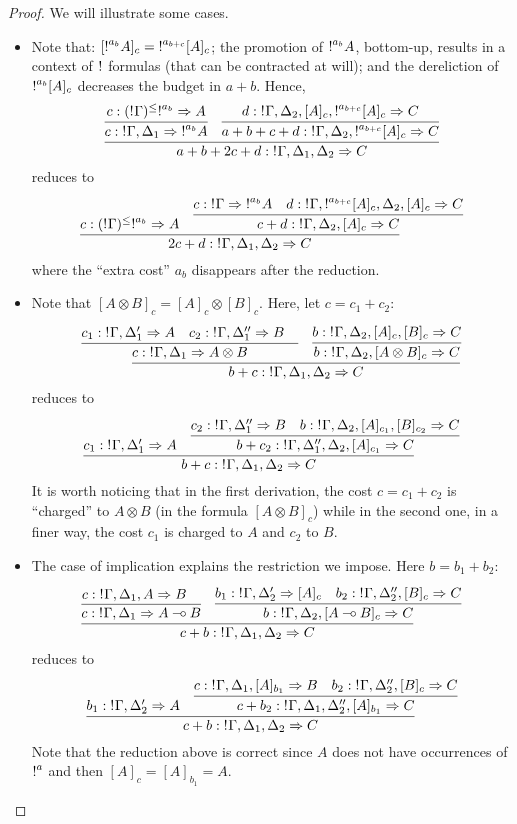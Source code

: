 \begin{proof}
We will illustrate some cases. 
\begin{itemize}
 \item Note that: $[\hbox{$\mathop{!}^{a_b}$}A]_c = \hbox{$\mathop{!}^{a_{b+c}}$}[A]_c$;  the promotion of $\hbox{$\mathop{!}^{a_b}$}A$, bottom-up, results in a context of 
 $\hbox{$\mathop{!}^{}$}$ formulas (that can be contracted at will);
 and   the dereliction of $\hbox{$\mathop{!}^{a_b}$}[A]_c$ decreases the budget in $a + b$. Hence, 
  $$
 \infer{a + b + 2c+d: \nbang{}\Gamma,\Delta_1,\Delta_2 \seq C}{
   \infer{c: \nbang{}\Gamma,\Delta_1 \seq \nbang{a_b}A}{c: (\nbang{}\Gamma)^\leqn{a_b}\seq A}&
   \infer{a+b+c+d: \nbang{}\Gamma, \Delta_2, \nbang{a_{b+c}}[A]_c \seq C}{d: \nbang{}\Gamma, \Delta_2, [A]_{c}, \nbang{a_{b+c}}[A]_c \seq C}
 }
 $$
reduces to
$$
   \infer{2c+d: \nbang{}\Gamma,\Delta_1,\Delta_2 \seq C}{
    \deduce{c: (\nbang{}\Gamma)^\leqn{a_b} \seq A}{} &
     \infer{c+d: \nbang{}\Gamma,\Delta_2, [A]_{c}\seq C}{
      \deduce{c:\nbang{}\Gamma \seq \nbang{a_b}A}{}&
      \deduce{d:\nbang{}\Gamma,\nbang{a_{b+c}}[A]_c, \Delta_2, [A]_{c}\seq C}{}
     }
    }
 $$
where the  ``extra cost'' $a_b$ disappears after the reduction. 
 \item Note that $[A\otimes B]_c = [A]_{c} \otimes [B]_c$. Here, let $c = c_1 + c_2$: 
 \[
 \infer{b+c: \nbang{}\Gamma,\Delta_1,\Delta_2 \seq C}{
  \infer{c:\nbang{}\Gamma,\Delta_1 \seq A \otimes B}{
   \deduce{c_1: \nbang{}\Gamma,\Delta_1' \seq A}{} &
   \deduce{c_2:\nbang{}\Gamma,\Delta_1'' \seq B}{} &
  } &
  \infer{b: \nbang{}\Gamma,\Delta_2, [A \otimes B]_{c} \seq C}{b: \nbang{}\Gamma,\Delta_2, [A]_c, [B]_c \seq C}
 }
 \]
 reduces to
\[
 \infer{b+c: \nbang{}\Gamma,\Delta_1,\Delta_2 \seq C}{
  \deduce{c_1: \nbang{}\Gamma,\Delta_1' \seq A}{} &
  \infer{b+c_2: \nbang{}\Gamma,\Delta_1 '',\Delta_2, [A]_{c_1} \seq C}{
   \deduce{c_2: \nbang{}\Gamma,\Delta_1'' \seq B}{} &
   \deduce{b: \nbang{}\Gamma,\Delta_2,[A]_{c_1}, [B]_{c_2} \seq C}{}
  }
 }
 \]
 It is worth noticing that in the first derivation, the cost $c=c_1 + c_2$ is ``charged'' to  $A\otimes B$ 
(in the formula $[A \otimes B]_c$)
while in the second one, in a  finer way, the cost $c_1$ is charged to $A$ and $c_2$ to $B$. 
 \item The case of implication explains the restriction we impose. Here $b = b_1 + b_2$:
 $$
\infer{c+b: \nbang{}\Gamma,\Delta_1,\Delta_2 \seq C }{
  \infer{c: \nbang{}\Gamma,\Delta_1 \seq A\limp B}{
   \deduce{c: \nbang{}\Gamma,\Delta_1,A  \seq B}{}&
   }&
   \infer{b: \nbang{}\Gamma,\Delta_2, [A \limp B]_c \seq C }{
     \deduce{b_1: \nbang{}\Gamma,\Delta_2' \seq [A]_{c}}{}&
     \deduce{b_2: \nbang{}\Gamma,\Delta_2'', [B]_c\seq C}{}
   }
}
 $$
 reduces to 
 \[
 \infer{c+b: \nbang{}\Gamma,\Delta_1,\Delta_2 \seq C}{
   \deduce{b_1: \nbang{}\Gamma,\Delta_2' \seq A}{}&
   \infer{c+b_2: \nbang{}\Gamma,\Delta_1,\Delta_2'', [A]_{b_1} \seq C}{
    \deduce{c: \nbang{}\Gamma,\Delta_1, [A]_{b_1} \seq B}{} &
    \deduce{b_2: \nbang{}\Gamma,\Delta_2'', [B]_{c} \seq C}{}
   }
 }
 \]
Note that the reduction above is correct since $A$ does not have 
occurrences of $\hbox{$\mathop{!}^{a}$}$ and then  $[A]_c = [A]_{b_1}=A$. 
\end{itemize}
\end{proof}
